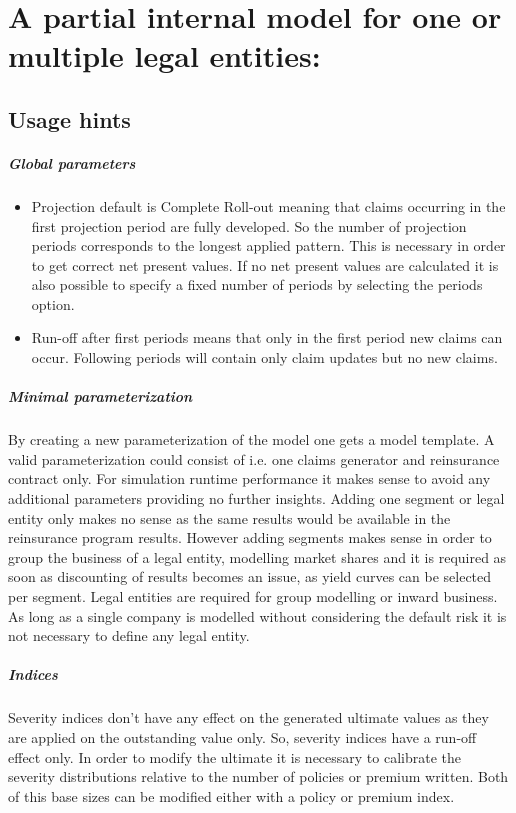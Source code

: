 \chapter[General Insurance Cashflow Model \GIRA]{A partial internal model for one or multiple legal entities: \GIRA}
\label{chap:gira}

\section{Usage hints}
\paragraph{Global parameters}
\begin{itemize}
	\item Projection default is Complete Roll-out meaning that claims occurring in the first projection period are fully developed. So the number of projection periods corresponds to the longest applied pattern. This is necessary in order to get correct net present values. If no net present values are calculated it is also possible to specify a fixed number of periods by selecting the periods option.
	\item Run-off after first periods means that only in the first period new claims can occur. Following periods will contain only claim updates but no new claims.
\end{itemize}

\paragraph{Minimal parameterization}
By creating a new parameterization of the \GIRA{} model one gets a model template. A valid parameterization could consist of i.e. one claims generator and reinsurance contract only. For simulation runtime performance it makes sense to avoid any additional parameters providing no further insights. Adding one segment or legal entity only makes no sense as the same results would be available in the reinsurance program results. However adding segments makes sense in order to group the business of a legal entity, modelling market shares and it is required as soon as discounting of results becomes an issue, as yield curves can be selected per segment. Legal entities are required for group modelling or inward business. As long as a single company is modelled without considering the default risk it is not necessary to define any legal entity. 

\paragraph{Indices}
Severity indices don't have any effect on the generated ultimate values as they are applied on the outstanding value only. So, severity indices have a run-off effect only. In order to modify the ultimate it is necessary to calibrate the severity distributions relative to the number of policies or premium written. Both of this base sizes can be modified either with a policy or premium index. 

